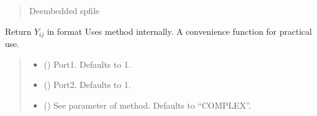\documentclass[letterpaper,10pt,english]{sphinxmanual}
\begin{document}
\begin{fulllineitems}
\begin{fulllineitems}
\begin{quote}
\begin{description}
\begin{itemize}
\end{itemize}

\sphinxAtStartPar
De\sphinxhyphen{}embedded spfile

\sphinxAtStartPar
{\hyperref[\detokenize{touchstone:touchstone.spfile}]{}}

\end{description}\end{quote}

\end{fulllineitems}


\begin{fulllineitems}
\label{\detokenize{touchstone:touchstone.spfile.Y}}
\pysigstartsignatures
{}
\pysigstopsignatures
\sphinxAtStartPar
Return \(Y_{i j}\) in format 
Uses  method internally. A convenience function for practical use.
\begin{quote}\begin{description}
\begin{itemize}
\item {} 
\sphinxAtStartPar
{} (\sphinxstyleliteralemphasis{\sphinxupquote{, }}) \textendash{} Port\sphinxhyphen{}1. Defaults to 1.

\item {} 
\sphinxAtStartPar
{} (\sphinxstyleliteralemphasis{\sphinxupquote{, }}) \textendash{} Port\sphinxhyphen{}2. Defaults to 1.

\item {} 
\sphinxAtStartPar
{} (\sphinxstyleliteralemphasis{\sphinxupquote{, }}) \textendash{} See  parameter of  method. Defaults to “COMPLEX”.


\end{itemize}
\end{description}
\end{quote}
\end{fulllineitems}
\end{fulllineitems}
\end{document}
